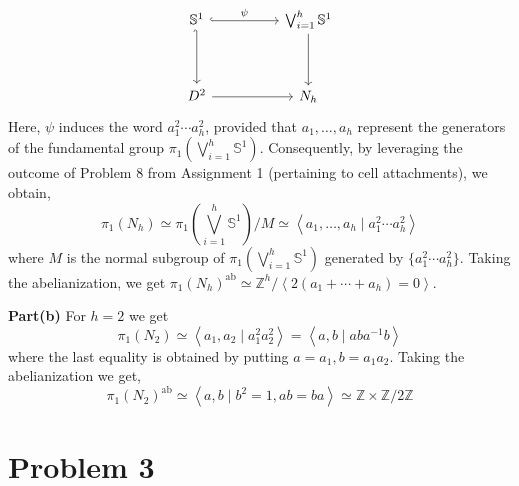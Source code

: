 \documentclass[11pt]{article}
\begin{document}
\[
\begin{tikzcd}
\mathbb{S}^1 && \bigvee_{i=1}^{h} \mathbb{S}^1 \\
\\
D^2 && {N_h}
\arrow[hook, "\psi", from=1-1, to=1-3]
\arrow[hook', from=1-1, to=3-1]
\arrow[from=3-1, to=3-3]
\arrow[from=1-3, to=3-3]
\end{tikzcd}
\]
Here, \( \psi \) induces the word \( a_1^2 \cdots a_h^2 \), provided that \( a_1, \dots, a_h \) represent the generators of the fundamental group \( \pi_1(\bigvee_{i=1}^{h} \mathbb{S}^1) \). Consequently, by leveraging the outcome of Problem 8 from Assignment 1 (pertaining to cell attachments), we obtain, 
\[
    \pi_1(N_h) \simeq \pi_1\left(\bigvee_{i=1}^{h} \mathbb{S}^1\right) \Bigg/ M \simeq \left\langle {a_1, \dots, a_h} \mid {a_1^2\cdots a_h^2} \right\rangle
\]
where \( M \) is the normal subgroup of \( \pi_1(\bigvee_{i=1}^{h}\mathbb{S}^1) \) generated by \( \{a_1^2\cdots a_h^2\} \). Taking the abelianization, we get \( {\pi_1(N_h)}^{\text{ab}} \simeq \mathbb{Z}^h/\left\langle 2(a_1+\cdots+a_h) = 0 \right\rangle \).

\vspace*{0.2cm}

\noindent \textbf{Part(b)} For \( h=2 \) we get
\[
  \pi_1(N_2) \simeq \left\langle a_1, a_2 \mid {a_1^2a_2^2} \right\rangle = \left\langle {a,b}\mid  {aba^{-1}b} \right\rangle
\]
where the last equality is obtained by putting \( a = a_1, b = a_1a_2 \). Taking the abelianization we get,
\[
  {\pi_1(N_2)}^{\text{ab}} \simeq \left\langle {a,b}\mid {b^2 = 1, ab =ba} \right\rangle \simeq \mathbb{Z} \times \mathbb{Z}/2 \mathbb{Z}
\]



 \section{Problem 3}
\end{document}
